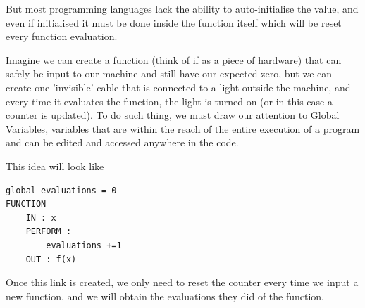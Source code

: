 But most programming languages lack the ability to auto-initialise the value, and even if initialised it must be done inside the function itself which will be reset every function evaluation.

Imagine we can create a function (think of if as a piece of hardware) that can safely be input to our machine and still have our expected zero, but we  can create one 'invisible' cable that is connected to a light outside the machine, and every time it evaluates the function, the light is turned on (or in this case a counter is updated). To do such thing, we must draw our attention to Global Variables, variables that are within the reach of the entire execution of a program and can be edited and accessed anywhere in the code. 

This idea will look like 
\begin{lstlisting}
global evaluations = 0
FUNCTION 
    IN : x
    PERFORM : 
        evaluations +=1
    OUT : f(x)
\end{lstlisting}


Once this link is created, we only need to reset the counter every time we input a new function, and we will obtain the evaluations they did of the function.




